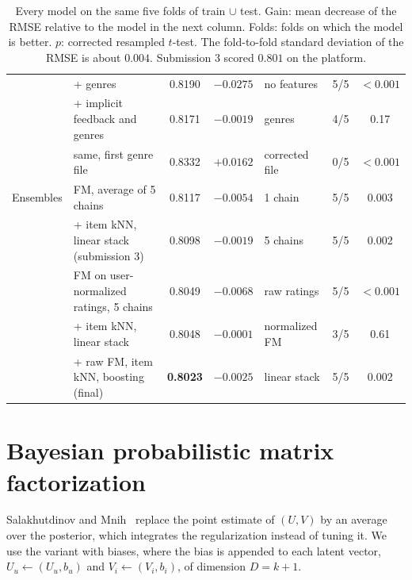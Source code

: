 \documentclass[10pt,a4paper,twocolumn]{article}
\begin{document}
\begin{table}[t]
\begin{tabular}{@{}llcclcc@{}}
              & + genres                                      & 0.8190 & $-0.0275$ & no features        & 5/5 & $<0.001$ \\
              & + implicit feedback and genres                & 0.8171 & $-0.0019$ & genres             & 4/5 & 0.17   \\
              & \quad same, first genre file                  & 0.8332 & $+0.0162$ & corrected file     & 0/5 & $<0.001$ \\
\midrule
Ensembles     & FM, average of 5 chains                       & 0.8117 & $-0.0054$ & 1 chain            & 5/5 & 0.003  \\
              & \quad + item kNN, linear stack (submission 3) & 0.8098 & $-0.0019$ & 5 chains           & 5/5 & 0.002  \\
              & FM on user-normalized ratings, 5 chains       & 0.8049 & $-0.0068$ & raw ratings        & 5/5 & $<0.001$ \\
              & \quad + item kNN, linear stack                & 0.8048 & $-0.0001$ & normalized FM      & 3/5 & 0.61   \\
              & \quad + raw FM, item kNN, boosting (final)    & \textbf{0.8023} & $-0.0025$ & linear stack & 5/5 & 0.002  \\
\bottomrule
\end{tabular}
\caption{Every model on the same five folds of train $\cup$ test. Gain: mean decrease of the RMSE relative
to the model in the next column. Folds: folds on which the model is better. $p$: corrected resampled $t$-test.
The fold-to-fold standard deviation of the RMSE is about $0.004$. Submission 3 scored $0.801$ on the platform.}
\label{tab:all}
\end{table}

\section{Bayesian probabilistic matrix factorization}

Salakhutdinov and Mnih~\cite{bpmf} replace the point estimate of $(U, V)$ by an average over the posterior,
which integrates the regularization instead of tuning it. We use the variant with biases, where the bias is
appended to each latent vector, $U_u \leftarrow (U_u, b_u)$ and $V_i \leftarrow (V_i, b_i)$, of dimension
$D = k + 1$.
\end{document}
